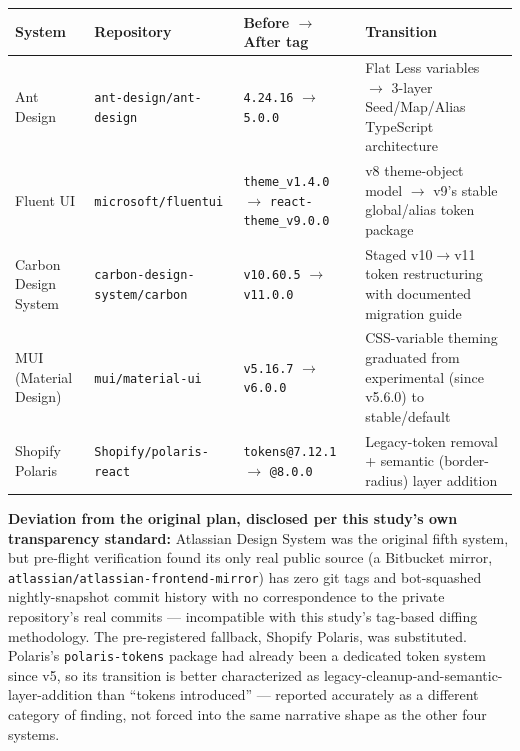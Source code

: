 \documentclass[11pt]{article}
\begin{document}
\begin{center}
\small
\begin{tabular}{p{2.2cm} p{2.7cm} p{3.1cm} p{4.9cm}}
\toprule
\textbf{System} & \textbf{Repository} & \textbf{Before \(\to\) After tag} & \textbf{Transition} \\
\midrule
Ant Design & \texttt{ant-design/\allowbreak ant-design} & \texttt{4.24.16} \(\to\) \newline \texttt{5.0.0} & Flat Less variables \(\to\) 3-layer Seed/Map/Alias TypeScript architecture \\[0.4em]
Fluent UI & \texttt{microsoft/\allowbreak fluentui} & \texttt{theme\_v1.4.0} \(\to\) \newline \texttt{react-theme\_v9.0.0} & v8 theme-object model \(\to\) v9's stable global/alias token package \\[0.4em]
Carbon Design System & \texttt{carbon-design-\allowbreak system/carbon} & \texttt{v10.60.5} \(\to\) \newline \texttt{v11.0.0} & Staged v10\(\to\)v11 token restructuring with documented migration guide \\[0.4em]
MUI (Material Design) & \texttt{mui/\allowbreak material-ui} & \texttt{v5.16.7} \(\to\) \newline \texttt{v6.0.0} & CSS-variable theming graduated from experimental (since v5.6.0) to stable/default \\[0.4em]
Shopify Polaris & \texttt{Shopify/\allowbreak polaris-react} & \texttt{tokens@7.12.1} \(\to\) \newline \texttt{@8.0.0} & Legacy-token removal + semantic (border-radius) layer addition \\
\bottomrule
\end{tabular}
\end{center}

\noindent\textbf{Deviation from the original plan, disclosed per this study's own transparency standard:} Atlassian Design System was the original fifth system, but pre-flight verification found its only real public source (a Bitbucket mirror, \texttt{atlassian/atlassian-frontend-mirror}) has zero git tags and bot-squashed nightly-snapshot commit history with no correspondence to the private repository's real commits --- incompatible with this study's tag-based diffing methodology. The pre-registered fallback, Shopify Polaris, was substituted. Polaris's \texttt{polaris-tokens} package had already been a dedicated token system since v5, so its transition is better characterized as legacy-cleanup-and-semantic-layer-addition than ``tokens introduced'' --- reported accurately as a different category of finding, not forced into the same narrative shape as the other four systems.
\end{document}
